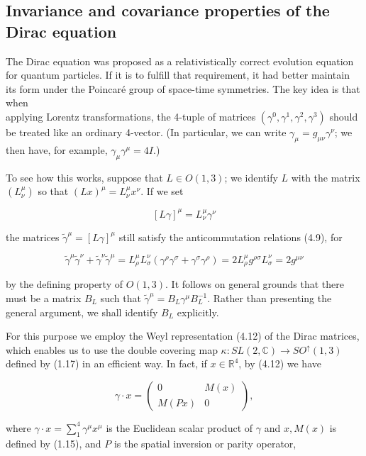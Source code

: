 \documentclass[10pt, letterpaper]{article}
\begin{document}
\subsection*{Invariance and covariance properties of the Dirac equation}
The Dirac equation was proposed as a relativistically correct evolution equation for quantum particles. If it is to fulfill that requirement, it had better maintain its form under the Poincaré group of space-time symmetries. The key idea is that when\\
applying Lorentz transformations, the 4-tuple of matrices $\left(\gamma^{0}, \gamma^{1}, \gamma^{2}, \gamma^{3}\right)$ should be treated like an ordinary 4-vector. (In particular, we can write $\gamma_{\mu}=g_{\mu \nu} \gamma^{\nu}$; we then have, for example, $\gamma_{\mu} \gamma^{\mu}=4 I$.)

To see how this works, suppose that $L \in O(1,3)$; we identify $L$ with the matrix $\left(L_{\nu}^{\mu}\right)$ so that $(L x)^{\mu}=L_{\nu}^{\mu} x^{\nu}$. If we set

$$
[L \gamma]^{\mu}=L_{\nu}^{\mu} \gamma^{\nu}
$$

the matrices $\widetilde{\gamma}^{\mu}=[L \gamma]^{\mu}$ still satisfy the anticommutation relations (4.9), for

$$
\widetilde{\gamma}^{\mu} \widetilde{\gamma}^{\nu}+\widetilde{\gamma}^{\nu} \widetilde{\gamma}^{\mu}=L_{\rho}^{\mu} L_{\sigma}^{\nu}\left(\gamma^{\rho} \gamma^{\sigma}+\gamma^{\sigma} \gamma^{\rho}\right)=2 L_{\rho}^{\mu} g^{\rho \sigma} L_{\sigma}^{\nu}=2 g^{\mu \nu}
$$

by the defining property of $O(1,3)$. It follows on general grounds that there must be a matrix $B_{L}$ such that $\widetilde{\gamma}^{\mu}=B_{L} \gamma^{\mu} B_{L}^{-1}$. Rather than presenting the general argument, we shall identify $B_{L}$ explicitly.

For this purpose we employ the Weyl representation (4.12) of the Dirac matrices, which enables us to use the double covering map $\kappa: S L(2, \mathbb{C}) \rightarrow S O^{\uparrow}(1,3)$ defined by (1.17) in an efficient way. In fact, if $x \in \mathbb{R}^{4}$, by (4.12) we have

$$
\gamma \cdot x=\left(\begin{array}{cc}
0 & M(x) \\
M(P x) & 0
\end{array}\right),
$$

where $\gamma \cdot x=\sum_{1}^{4} \gamma^{\mu} x^{\mu}$ is the Euclidean scalar product of $\gamma$ and $x, M(x)$ is defined by (1.15), and $P$ is the spatial inversion or parity operator,
\end{document}
